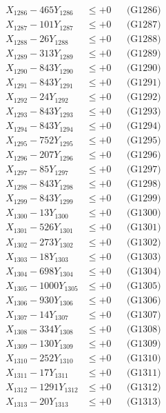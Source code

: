 \documentclass[a4paper,10pt]{article}
\begin{document}
{\begin{align}
X_{1286} - 465Y_{1286} &\leq +0 && \text{(G1286)} \\
X_{1287} - 101Y_{1287} &\leq +0 && \text{(G1287)} \\
X_{1288} - 26Y_{1288} &\leq +0 && \text{(G1288)} \\
X_{1289} - 313Y_{1289} &\leq +0 && \text{(G1289)} \\
X_{1290} - 843Y_{1290} &\leq +0 && \text{(G1290)} \\
\allowbreak
X_{1291} - 843Y_{1291} &\leq +0 && \text{(G1291)} \\
X_{1292} - 24Y_{1292} &\leq +0 && \text{(G1292)} \\
X_{1293} - 843Y_{1293} &\leq +0 && \text{(G1293)} \\
X_{1294} - 843Y_{1294} &\leq +0 && \text{(G1294)} \\
X_{1295} - 752Y_{1295} &\leq +0 && \text{(G1295)} \\
X_{1296} - 207Y_{1296} &\leq +0 && \text{(G1296)} \\
X_{1297} - 85Y_{1297} &\leq +0 && \text{(G1297)} \\
X_{1298} - 843Y_{1298} &\leq +0 && \text{(G1298)} \\
X_{1299} - 843Y_{1299} &\leq +0 && \text{(G1299)} \\
X_{1300} - 13Y_{1300} &\leq +0 && \text{(G1300)} \\
\allowbreak
X_{1301} - 526Y_{1301} &\leq +0 && \text{(G1301)} \\
X_{1302} - 273Y_{1302} &\leq +0 && \text{(G1302)} \\
X_{1303} - 18Y_{1303} &\leq +0 && \text{(G1303)} \\
X_{1304} - 698Y_{1304} &\leq +0 && \text{(G1304)} \\
X_{1305} - 1000Y_{1305} &\leq +0 && \text{(G1305)} \\
X_{1306} - 930Y_{1306} &\leq +0 && \text{(G1306)} \\
X_{1307} - 14Y_{1307} &\leq +0 && \text{(G1307)} \\
X_{1308} - 334Y_{1308} &\leq +0 && \text{(G1308)} \\
X_{1309} - 130Y_{1309} &\leq +0 && \text{(G1309)} \\
X_{1310} - 252Y_{1310} &\leq +0 && \text{(G1310)} \\
\allowbreak
X_{1311} - 17Y_{1311} &\leq +0 && \text{(G1311)} \\
X_{1312} - 1291Y_{1312} &\leq +0 && \text{(G1312)} \\
X_{1313} - 20Y_{1313} &\leq +0 && \text{(G1313)} \\

\end{align}}
\end{document}

